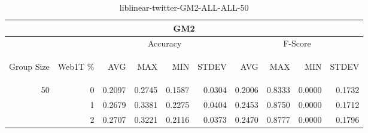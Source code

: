 \begin{center}
\begin{table}[htbp]
\begin{tabular}{ | r | r | r | r | r | r | r | r | r | r |}
\hline
\multicolumn{10}{|c|}{GM2}\\
\hline
 & & \multicolumn{4}{|c|}{Accuracy} & \multicolumn{4}{|c|}{F-Score}\\ \cline{3-10}
\begin{sideways}Group Size\end{sideways} & \begin{sideways}Web1T \%\end{sideways} & \begin{sideways}AVG\end{sideways} & \begin{sideways}MAX\end{sideways} & \begin{sideways}MIN\end{sideways} & \begin{sideways}STDEV\end{sideways} & \begin{sideways}AVG\end{sideways} & \begin{sideways}MAX\end{sideways} & \begin{sideways}MIN\end{sideways} & \begin{sideways}STDEV\end{sideways}\\
\hline
\multirow{2}{*}{50}
 & 0 & 0.2097 & 0.2745 & 0.1587 & 0.0304 & 0.2006 & 0.8333 & 0.0000 & 0.1732\\ \cline{2-10}
 & 1 & 0.2679 & 0.3381 & 0.2275 & 0.0404 & 0.2453 & 0.8750 & 0.0000 & 0.1712\\ \cline{2-10}
 & 2 & 0.2707 & 0.3221 & 0.2116 & 0.0373 & 0.2470 & 0.8777 & 0.0000 & 0.1796\\ \cline{2-10}
\hline
\end{tabular}
\caption{liblinear-twitter-GM2-ALL-ALL-50}
\label{table:liblinear-twitter-GM2-ALL-ALL-50}
\end{table}
\end{center}

